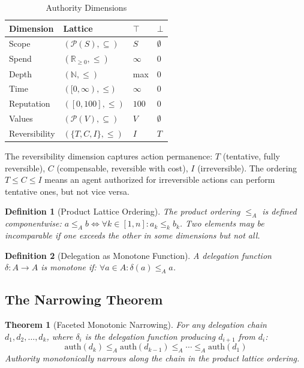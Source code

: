 \documentclass[sigconf,nonacm]{acmart}
\newtheorem{theorem}{Theorem}
\newtheorem{definition}{Definition}
\begin{document}
\begin{table}[h]
\caption{Authority Dimensions}
\label{tab:dimensions}
\begin{tabular}{@{}llll@{}}
\toprule
Dimension & Lattice & $\top$ & $\bot$ \\
\midrule
Scope & $(\mathcal{P}(S), \subseteq)$ & $S$ & $\emptyset$ \\
Spend & $(\mathbb{R}_{\geq 0}, \leq)$ & $\infty$ & $0$ \\
Depth & $(\mathbb{N}, \leq)$ & max & $0$ \\
Time & $([0,\infty), \leq)$ & $\infty$ & $0$ \\
Reputation & $([0,100], \leq)$ & $100$ & $0$ \\
Values & $(\mathcal{P}(V), \subseteq)$ & $V$ & $\emptyset$ \\
Reversibility & $(\{T,C,I\}, \leq)$ & $I$ & $T$ \\
\bottomrule
\end{tabular}
\end{table}

The reversibility dimension captures action permanence: $T$ (tentative, fully reversible),
$C$ (compensable, reversible with cost), $I$ (irreversible). The ordering $T \leq C \leq I$
means an agent authorized for irreversible actions can perform tentative ones, but not
vice versa.

\begin{definition}[Product Lattice Ordering]
The product ordering $\leq_A$ is defined componentwise:
$a \leq_A b \iff \forall k \in [1,n]: a_k \leq_k b_k$.
Two elements may be incomparable if one exceeds the other in some dimensions but not all.
\end{definition}

\begin{definition}[Delegation as Monotone Function]
A delegation function $\delta: A \to A$ is monotone if:
$\forall a \in A: \delta(a) \leq_A a$.
\end{definition}

\subsection{The Narrowing Theorem}

\begin{theorem}[Faceted Monotonic Narrowing]
For any delegation chain $d_1, d_2, \ldots, d_k$, where $\delta_i$ is the delegation
function producing $d_{i+1}$ from $d_i$:
\[
\text{auth}(d_k) \leq_A \text{auth}(d_{k-1}) \leq_A \cdots \leq_A \text{auth}(d_1)
\]
Authority monotonically narrows along the chain in the product lattice ordering.
\end{theorem}
\end{document}
